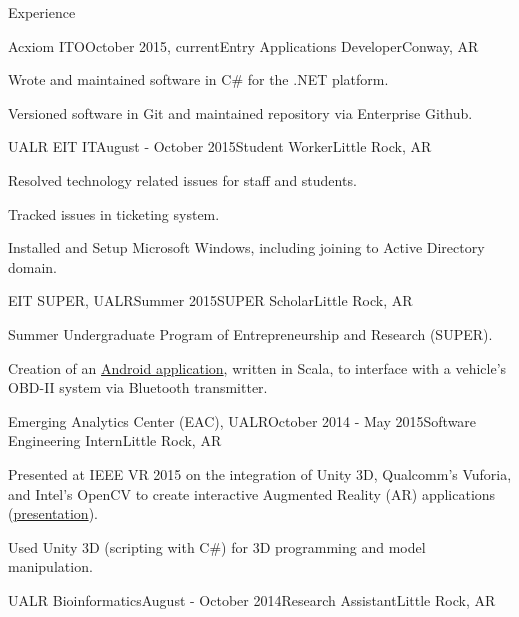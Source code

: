 \documentclass{resume} %
\begin{document}
\begin{rSection}{Experience}

\begin{rSubsection}{Acxiom ITO}{October 2015, current}{Entry Applications Developer}{Conway, AR}

	\item Wrote and maintained software in C\# for the .NET platform.
	\item Versioned software in Git and maintained repository via Enterprise Github.
\end{rSubsection}

\begin{rSubsection}{UALR EIT IT}{August - October 2015}{Student Worker}{Little Rock, AR}

	\item Resolved technology related issues for staff and students.
	\item Tracked issues in ticketing system.
	\item Installed and Setup Microsoft Windows, including joining to Active Directory domain.
\end{rSubsection}

\begin{rSubsection}{EIT SUPER, UALR}{Summer 2015}{SUPER Scholar}{Little Rock, AR}
	\item Summer Undergraduate Program of Entrepreneurship and Research (SUPER).
	\item Creation of an \href{http://github.com/cptaffe/flamethrower}{Android application}, written in Scala, to interface with a vehicle's OBD-II system via Bluetooth transmitter.
\end{rSubsection}

\begin{rSubsection}{Emerging Analytics Center (EAC), UALR}{October 2014 - May 2015}{Software Engineering Intern}{Little Rock, AR}
	\item Presented at IEEE VR 2015 on the integration of Unity 3D, Qualcomm's Vuforia, and Intel's OpenCV to create interactive Augmented Reality (AR) applications (\href{http://byteflame.org/ieee_vr/}{presentation}{}).
	\item Used Unity 3D (scripting with C\#) for 3D programming and model manipulation.
\end{rSubsection}

\begin{rSubsection}{UALR Bioinformatics}{August - October 2014}{Research Assistant}{Little Rock, AR}


\end{rSubsection}
\end{rSection}
\end{document}
